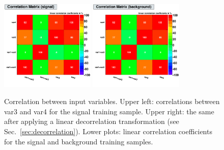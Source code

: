 \begin{figure}[t]
\begin{center}
  \vspace{0.2cm}

  \def\thissize{0.40}
  \includegraphics[width=\thissize\textwidth]{plots/CorrelationMatrixS}
  \includegraphics[width=\thissize\textwidth]{plots/CorrelationMatrixB}
\end{center}
\vspace{-0.7cm}
\caption[.]{Correlation between input variables. Upper left: correlations
         between var3 and var4 for the signal training sample. 
         Upper right: the same after applying a linear decorrelation transformation 
         (see Sec.~\ref{sec:decorrelation}). Lower plots: 
         linear correlation coefficients for the signal and background 
         training samples.
}
\label{fig:usingtmva:correlations}
\end{figure}
